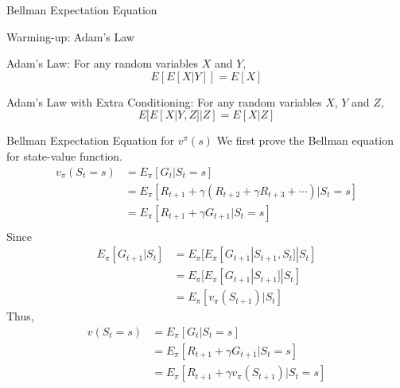 \documentclass{beamer}
\begin{document}
\begin{frame}{Bellman Expectation Equation}

\end{frame}

\begin{frame}{Warming-up: Adam's Law}
    \begin{exampleblock}{Adam's Law:}
        For any random variables $X$ and $Y$,
        \[
        {E}[ {E}[ X|Y ] ] = {E}[ X ]
        \]
    \end{exampleblock}

    \begin{exampleblock}{Adam's Law with Extra Conditioning:}
        For any random variables $X$, $Y$ and $Z$,
        \[
        {E}[ {E}[ X|Y,Z ]|Z ] = {E}[ X|Z ]
        \]
    \end{exampleblock}
\end{frame}

\begin{frame}{Bellman Expectation Equation for $v^\pi(s)$}
    We first prove the Bellman equation for state-value function.
    \[
    \begin{split}
    v_{\pi}(S_t=s) 
        & = E_{\pi}[G_t|S_t = s]\\
        & = E_{\pi}[R_{t+1} 
        + \gamma (R_{t+2} + \gamma R_{t+3} +\cdots) |S_t = s]\\
        & = E_{\pi}[R_{t+1} + \gamma G_{t+1}|S_t = s] \\
    \end{split}
    \]
    Since
    \[
    \begin{split}
        E_{\pi}[G_{t+1}|S_t] & = E_{\pi}[E_{\pi}[G_{t+1}|S_{t+1}, S_t]|S_t] \\
        & = E_{\pi}[E_{\pi}[G_{t+1}|S_{t+1}]|S_t] \\
        & = E_{\pi}[v_\pi(S_{t+1})|S_t]
    \end{split}
    \]
    Thus,
    \[
    \begin{split}
        v(S_t = s) &= E_{\pi}[G_t|S_t = s] \\
        & = E_{\pi}[R_{t+1} + \gamma G_{t+1}|S_t = s] \\
        & = E_{\pi}[R_{t+1} + \gamma v_\pi(S_{t+1})|S_t = s]
    \end{split}
    \]
\end{frame}
\end{document}
